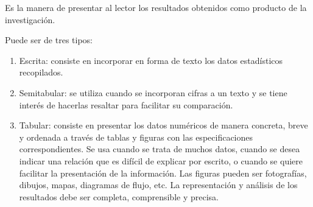 Es la manera de presentar al lector los resultados obtenidos como producto de la investigación.

Puede ser de tres tipos:

\begin{enumerate}[noitemsep]
 \item Escrita: consiste en incorporar en forma de texto los datos estadísticos recopilados.
 \item Semitabular: se utiliza cuando se incorporan cifras a un texto y se tiene interés de hacerlas resaltar para facilitar su comparación.
 \item Tabular: consiste en presentar los datos numéricos de manera concreta, breve y ordenada a través de tablas y figuras con las especificaciones correspondientes. Se usa cuando se trata de muchos datos, cuando se desea indicar una relación que es difícil de explicar por escrito, o cuando se quiere facilitar la presentación de la información. Las figuras pueden ser fotografías, dibujos, mapas, diagramas de flujo, etc. La representación y análisis de los resultados debe ser completa, comprensible y precisa.
\end{enumerate}
